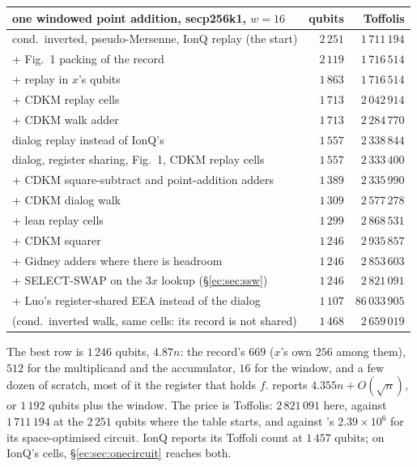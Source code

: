 \documentclass[11pt]{article}
\theoremstyle{plain}
\theoremstyle{remark}
\begin{document}
\begin{center}\small
\begin{tabular}{lrr}
\toprule
one windowed point addition, secp256k1, $w=16$ & qubits & Toffolis\\
\midrule
cond.\ inverted, pseudo-Mersenne, IonQ replay (the start) & $2\,251$ & $1\,711\,194$\\
\quad + Fig.~1 packing of the record & $2\,119$ & $1\,716\,514$\\
\quad + replay in $x$'s qubits & $1\,863$ & $1\,716\,514$\\
\quad + CDKM replay cells & $1\,713$ & $2\,042\,914$\\
\quad + CDKM walk adder & $1\,713$ & $2\,284\,770$\\
\quad dialog replay instead of IonQ's & $1\,557$ & $2\,338\,844$\\
dialog, register sharing, Fig.~1, CDKM replay cells & $1\,557$ & $2\,333\,400$\\
\quad + CDKM square-subtract and point-addition adders & $1\,389$ & $2\,335\,990$\\
\quad + CDKM dialog walk & $1\,309$ & $2\,577\,278$\\
\quad + lean replay cells & $1\,299$ & $2\,868\,531$\\
\quad + CDKM squarer & $1\,246$ & $2\,935\,857$\\
\quad + Gidney adders where there is headroom & $1\,246$ & $2\,853\,603$\\
\quad + SELECT-SWAP on the $3x$ lookup (\S\ref{ec:sec:ssw}) & $1\,246$ & $2\,821\,091$\\
\quad + Luo's register-shared EEA instead of the dialog \cite{ec:ecdsafail26} & $1\,107$ & $86\,033\,905$\\
(cond.\ inverted walk, same cells: its record is not shared) & $1\,468$ & $2\,659\,019$\\
\bottomrule
\end{tabular}
\end{center}

The best row is $1\,246$ qubits, $4.87n$: the record's $669$ ($x$'s own $256$
among them), $512$ for the multiplicand and the accumulator, $16$ for the window, and a few dozen of
scratch, most of it the register that holds $f$. \cite{ec:schrott26} reports $4.355n+O(\sqrt n)$,
or $1\,192$ qubits plus the window. The price is Toffolis: $2\,821\,091$ here, against
$1\,711\,194$ at the $2\,251$ qubits where the table starts, and against
\cite{ec:schrott26}'s $2.39\times10^6$ for its space-optimised circuit. IonQ reports its Toffoli
count at $1\,457$ qubits; on IonQ's cells, \S\ref{ec:sec:onecircuit} reaches both.
\end{document}
